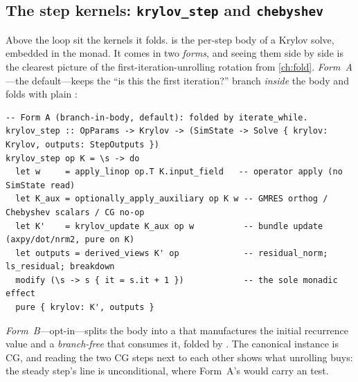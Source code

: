 \subsection{The step kernels: \texttt{krylov\_step} and \texttt{chebyshev}}

Above the loop sit the kernels it folds.  is the per-step body
of a Krylov solve, embedded in the  monad. It comes in two
\emph{forms}, and seeing them side by side is the clearest picture of the
first-iteration-unrolling rotation from \cref{ch:fold}. \emph{Form~A}---the
default---keeps the ``is this the first iteration?'' branch \emph{inside} the body
and folds with plain :

\begin{lstlisting}[style=l4style]
-- Form A (branch-in-body, default): folded by iterate_while.
krylov_step :: OpParams -> Krylov -> (SimState -> Solve { krylov: Krylov, outputs: StepOutputs })
krylov_step op K = \s -> do
  let w     = apply_linop op.T K.input_field   -- operator apply (no SimState read)
  let K_aux = optionally_apply_auxiliary op K w -- GMRES orthog / Chebyshev scalars / CG no-op
  let K'    = krylov_update K_aux op w          -- bundle update (axpy/dot/nrm2, pure on K)
  let outputs = derived_views K' op             -- residual_norm; ls_residual; breakdown
  modify (\s -> s { it = s.it + 1 })            -- the sole monadic effect
  pure { krylov: K', outputs }
\end{lstlisting}
\emph{Form~B}---opt-in---splits the body into a  that
manufactures the initial recurrence value and a \emph{branch-free}
 that consumes it, folded by
. The canonical instance is CG, and reading the
two CG steps next to each other shows what unrolling buys: the steady step's
 line is unconditional, where Form~A's would carry an 
test.

